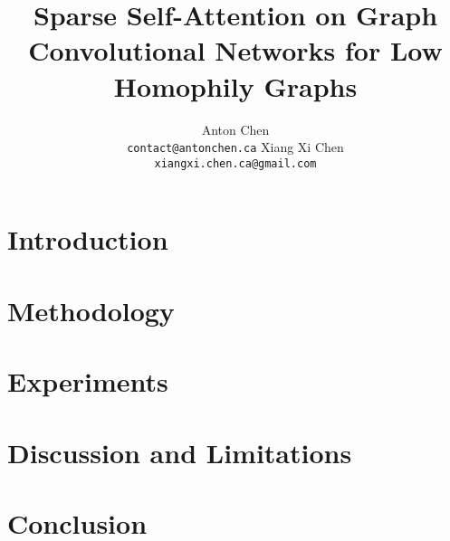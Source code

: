 \documentclass{article}
\title{Sparse Self-Attention on Graph Convolutional Networks
for Low Homophily Graphs}
\author{%
  Anton Chen\\
  \texttt{contact@antonchen.ca}
  \And
  Xiang Xi Chen\\
  \texttt{xiangxi.chen.ca@gmail.com}
}
\theoremstyle{definition}
\begin{document}
\maketitle

\begin{abstract}
  
\end{abstract}

\section{Introduction}


\section{Methodology}


\section{Experiments}


\section{Discussion and Limitations}


\section{Conclusion}


%   

\printbibliography

\appendix


\end{document}
